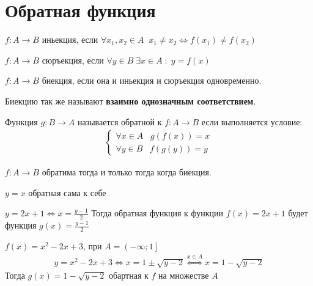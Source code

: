 \section{Обратная функция}

\begin{remind}
    $f: A \rightarrow B$ иньекция, если $\forall x_1, x_2 \in A \;\; x_1 \neq x_2 \iff f(x_1) \neq f(x_2)$
\end{remind}

\begin{definition}[Сюръекция]
    $f: A \rightarrow B$ сюръекция, если $\forall y \in B \; \exists x \in A \; : \; y = f(x)$
\end{definition}

\begin{definition}[Биекция]
    $f: A \rightarrow B$ биекция, если она и иньекция и сюръекция одновременно.
\end{definition}

\begin{remark}
    Биекцию так же называют \textbf{взаимно однозначным соответствием}.
\end{remark}

\begin{definition}
    Функция $g: B \rightarrow A$ называется обратной к $f: A \rightarrow B$
    если выполняется условие:
    \begin{align*}
        \left\{\begin{array}{l}
            \forall x \in A \;\;\; g(f(x)) = x \\
            \forall y \in B \;\;\; f(g(y)) = y
        \end{array}\right.
    \end{align*}
\end{definition}

\begin{remark}
    $f: A \rightarrow B$ обратима тогда и только тогда когда биекция.
\end{remark}

\begin{example}
    $y=x$ обратная сама к себе
\end{example}

\begin{example}
    $y=2x + 1 \iff x = \frac{y - 1}{2}$ Тогда обратная функция к функции $f(x) = 2x + 1$ будет функция $g(x) = \frac{y - 1}{2}$
\end{example}

\begin{example}
    $f(x) = x^2 - 2x + 3$, при $A = \left(-\infty; 1\right]$
    \begin{align*}
        y = x^2 - 2x + 3 \iff x = 1 \pm \sqrt{y - 2} \overset{x \in A}{\iff} x = 1 - \sqrt{y - 2}
    \end{align*}
    Тогда $g(x) = 1 - \sqrt{y - 2}$ обартная к $f$ на множестве $A$
\end{example}

